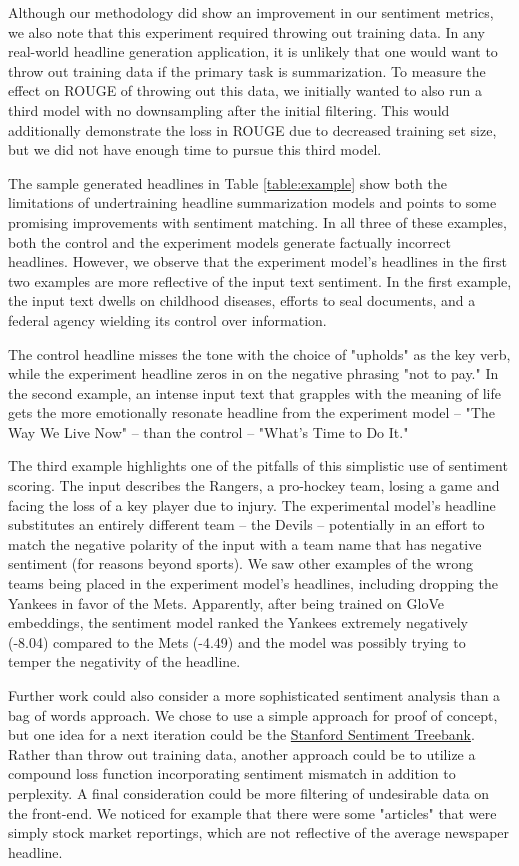 \documentclass[11pt]{article}
\begin{document}
Although our methodology did show an improvement in our sentiment metrics, we also note that this experiment required throwing out training data. In any real-world headline generation application, it is unlikely that one would want to throw out training data if the primary task is summarization. To measure the effect on ROUGE of throwing out this data, we initially wanted to also run a third model with no downsampling after the initial filtering. This would additionally demonstrate the loss in ROUGE due to decreased training set size, but we did not have enough time to pursue this third model.

The sample generated headlines in Table \ref{table:example} show both the limitations of undertraining headline summarization models and points to some promising improvements with sentiment matching. In all three of these examples, both the control and the experiment models generate factually incorrect headlines. However, we observe that the experiment model's headlines in the first two examples are more reflective of the input text sentiment. In the first example, the input text dwells on childhood diseases, efforts to seal documents, and a federal agency wielding its control over information. 

The control headline misses the tone with the choice of "upholds" as the key verb, while the experiment headline zeros in on the negative phrasing "not to pay." In the second example, an intense input text that grapples with the meaning of life gets the more emotionally resonate headline from the experiment model -- "The Way We Live Now" -- than the control -- "What's Time to Do It." 

The third example highlights one of the pitfalls of this simplistic use of sentiment scoring. The input describes the Rangers, a pro-hockey team, losing a game and facing the loss of a key player due to injury. The experimental model's headline substitutes an entirely different team -- the Devils -- potentially in an effort to match the negative polarity of the input with a team name that has negative sentiment (for reasons beyond sports). We saw other examples of the wrong teams being placed in the experiment model's headlines, including dropping the Yankees in favor of the Mets. Apparently, after being trained on GloVe embeddings, the sentiment model ranked the Yankees extremely negatively (-8.04) compared to the Mets (-4.49) and the model was possibly trying to temper the negativity of the headline.  

Further work could also consider a more sophisticated sentiment analysis than a bag of words approach. We chose to use a simple approach for proof of concept, but one idea for a next iteration could be the \href{https://nlp.stanford.edu/sentiment/index.html}{Stanford Sentiment Treebank}. Rather than throw out training data, another approach could be to utilize a compound loss function incorporating sentiment mismatch in addition to perplexity. A final consideration could be more filtering of undesirable data on the front-end. We noticed for example that there were some "articles" that were simply stock market reportings, which are not reflective of the average newspaper headline.
\end{document}

